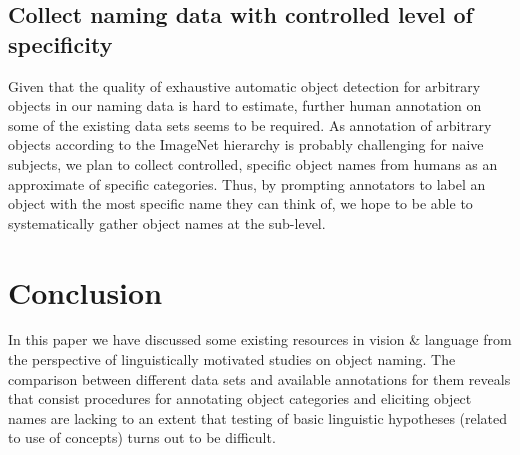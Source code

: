 \documentclass[runningheads]{llncs}
\begin{document}
\subsection{Collect naming data with controlled level of specificity}

Given that the quality of exhaustive automatic object detection for arbitrary objects in our naming data is hard to estimate, further human annotation on some of the existing data sets seems to be required.
As annotation of arbitrary objects according to the ImageNet hierarchy is probably challenging for naive subjects, we plan to collect controlled, specific object names from humans as an approximate of specific categories.
Thus, by prompting annotators to label an object with the most specific name they can think of, we hope to be able to systematically gather object names at the sub-level.


%


\section{Conclusion}

In this paper we have discussed some existing resources in vision \& language from the perspective of linguistically motivated studies on object naming.  
The comparison between different data sets and available annotations for them reveals that consist procedures for annotating object categories and eliciting object names are lacking to an extent that testing of  basic linguistic hypotheses (related to use of concepts) turns out to be difficult.



\clearpage

\begin{footnotesize}

\end{footnotesize}
\end{document}
